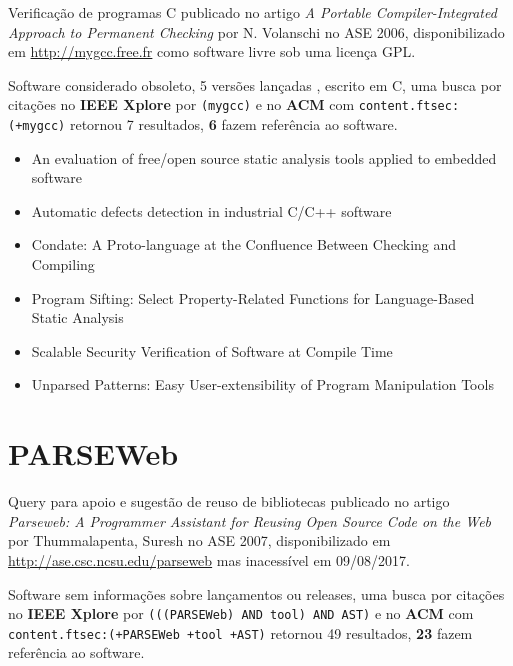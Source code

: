 Verificação de programas C
publicado no artigo {\it A Portable Compiler-Integrated Approach to Permanent Checking}
por N. Volanschi
no ASE 2006,
disponibilizado em \url{http://mygcc.free.fr}
como software livre
sob uma licença GPL.

Software considerado obsoleto,
5 versões lançadas
,
escrito em C,
uma busca por citações no {\bf IEEE Xplore} por
\texttt{(mygcc)}
e no {\bf ACM} com
\texttt{content.ftsec:(+mygcc)}
retornou
7 resultados,
{\bf 6} fazem referência ao software.

\begin{itemize}
\item An evaluation of free/open source static analysis tools applied to embedded software
\item Automatic defects detection in industrial C/C++ software
\item Condate: A Proto-language at the Confluence Between Checking and Compiling
\item Program Sifting: Select Property-Related Functions for Language-Based Static Analysis
\item Scalable Security Verification of Software at Compile Time
\item Unparsed Patterns: Easy User-extensibility of Program Manipulation Tools
\end{itemize}

\section{PARSEWeb}

Query para apoio e sugestão de reuso de bibliotecas
publicado no artigo {\it Parseweb: A Programmer Assistant for Reusing Open Source Code on the Web}
por Thummalapenta, Suresh
no ASE 2007,
disponibilizado em \url{http://ase.csc.ncsu.edu/parseweb}
mas inacessível em 09/08/2017.

Software sem informações sobre lançamentos ou releases,
uma busca por citações no {\bf IEEE Xplore} por
\texttt{(((PARSEWeb) AND tool) AND AST)}
e no {\bf ACM} com
\texttt{content.ftsec:(+PARSEWeb +tool +AST)}
retornou
49 resultados,
{\bf 23} fazem referência ao software.

